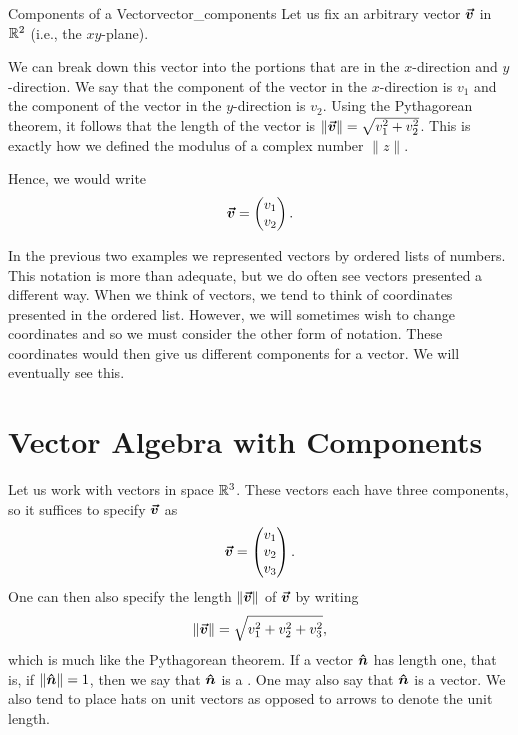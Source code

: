         \begin{ex}{Components of a Vector}{vector_components}
        Let us fix an arbitrary vector $\boldsymbol{\boldsymbol{\vec{v}}}$ in $\mathbb{R}^2$ (i.e., the $xy$-plane).  
        \begin{center}
        \end{center}
        We can break down this vector into the portions that are in the $x$-direction and $y$-direction.  We say that the component of the vector in the $x$-direction is $v_1$ and the component of the vector in the $y$-direction is $v_2$.  Using the Pythagorean theorem, it follows that the length of the vector is $\|\boldsymbol{\boldsymbol{\vec{v}}}\|=\sqrt{v_1^2+v_2^2}$. This is exactly how we defined the modulus of a complex number $\|z\|$.
        
        Hence, we would write
        \[
        \boldsymbol{\boldsymbol{\vec{v}}}=\begin{pmatrix} v_1 \\ v_2 \end{pmatrix}.
        \]
        \end{ex} 
        
        In the previous two examples we represented vectors by ordered lists of numbers.  This notation is more than adequate, but we do often see vectors presented a different way. When we think of vectors, we tend to think of coordinates presented in the ordered list.  However, we will sometimes wish to change coordinates and so we must consider the other form of notation. These coordinates would then give us different components for a vector.  We will eventually see this.
        
        \section{Vector Algebra with Components}
        Let us work with vectors in space $\mathbb{R}^3$.  These vectors each have three components, so it suffices to specify $\boldsymbol{\boldsymbol{\vec{v}}}$ as 
        \[
        \boldsymbol{\boldsymbol{\vec{v}}} = \begin{pmatrix} v_1 \\ v_2 \\ v_3 \end{pmatrix}.
        \]
        One can then also specify the length $\|\boldsymbol{\boldsymbol{\vec{v}}}\|$ of $\boldsymbol{\boldsymbol{\vec{v}}}$ by writing
        \[
        \|\boldsymbol{\boldsymbol{\vec{v}}}\| = \sqrt{ v_1^2 + v_2^2 + v_3^2},
        \]
        which is much like the Pythagorean theorem. If a vector $\boldsymbol{\hat{n}}$ has length one, that is, if $\|\boldsymbol{\hat{n}}\|=1$, then we say that $\boldsymbol{\hat{n}}$ is a . One may also say that $\boldsymbol{\hat{n}}$ is a  vector. We also tend to place hats on unit vectors as opposed to arrows to denote the unit length.
        
